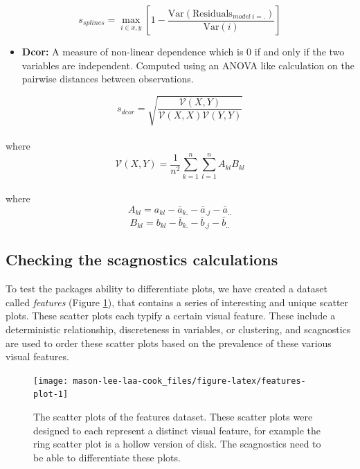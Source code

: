 \[s_{splines}=\max_{i\in x,y}\left[ 1-\frac{\mbox{Var}(\mbox{Residuals}_{model~i=.})}{\mbox{Var}(i)}\right] \]

\begin{itemize}
\tightlist
\item
  \textbf{Dcor:} A measure of non-linear dependence which is 0 if and only if the two variables are independent. Computed using an ANOVA like calculation on the pairwise distances between observations.
\end{itemize}

\[s_{dcor}= \sqrt{\frac{\mathcal{V}(X,Y)}{\mathcal{V}(X,X)\mathcal{V}(Y,Y)}}\]\\
where
\[\mathcal{V}
(X,Y)=\frac{1}{n^2}\sum_{k=1}^n\sum_{l=1}^nA_{kl}B_{kl}\]\\
where
\[A_{kl}=a_{kl}-\bar{a}_{k.}-\bar{a}_{.j}-\bar{a}_{..}\]
\[B_{kl}=b_{kl}-\bar{b}_{k.}-\bar{b}_{.j}-\bar{b}_{..}\]

\hypertarget{checking-the-scagnostics-calculations}{%
\subsection{Checking the scagnostics calculations}\label{checking-the-scagnostics-calculations}}

To test the packages ability to differentiate plots, we have created a dataset called \emph{features} (Figure \ref{fig:features-plot}), that contains a series of interesting and unique scatter plots. These scatter plots each typify a certain visual feature. These include a deterministic relationship, discreteness in variables, or clustering, and scagnostics are used to order these scatter plots based on the prevalence of these various visual features.

\begin{figure}
\texttt{[image: mason-lee-laa-cook\_files/figure-latex/features-plot-1]} \caption{The scatter plots of the features dataset. These scatter plots were designed to each represent a distinct visual feature, for example the ring scatter plot is a hollow version of disk. The scagnostics need to be able to differentiate these plots.}\label{fig:features-plot}
\end{figure}

